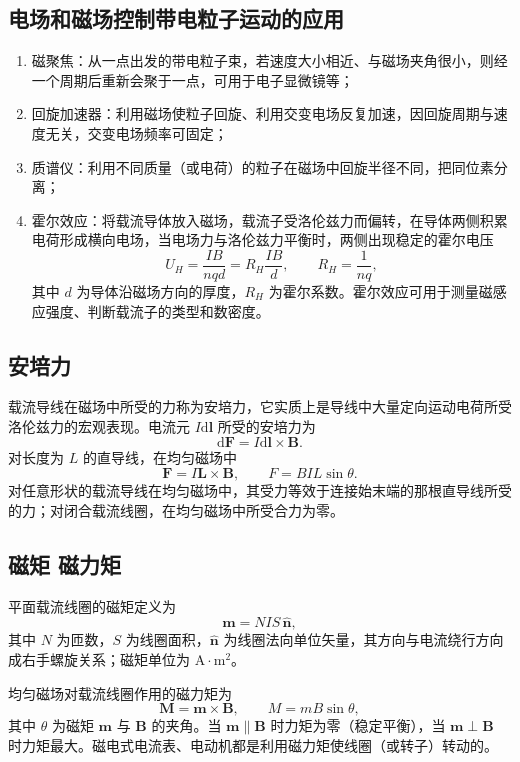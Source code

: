     \subsection{电场和磁场控制带电粒子运动的应用}
    \begin{enumerate}
        \item 磁聚焦：从一点出发的带电粒子束，若速度大小相近、与磁场夹角很小，则经一个周期后重新会聚于一点，可用于电子显微镜等；
        \item 回旋加速器：利用磁场使粒子回旋、利用交变电场反复加速，因回旋周期与速度无关，交变电场频率可固定；
        \item 质谱仪：利用不同质量（或电荷）的粒子在磁场中回旋半径不同，把同位素分离；
        \item 霍尔效应：将载流导体放入磁场，载流子受洛伦兹力而偏转，在导体两侧积累电荷形成横向电场，当电场力与洛伦兹力平衡时，两侧出现稳定的霍尔电压
        \[
        U_H=\frac{IB}{nqd}=R_H\frac{IB}{d},\qquad R_H=\frac{1}{nq},
        \]
        其中 $d$ 为导体沿磁场方向的厚度，$R_H$ 为霍尔系数。霍尔效应可用于测量磁感应强度、判断载流子的类型和数密度。
    \end{enumerate}

    \subsection{安培力}
    载流导线在磁场中所受的力称为安培力，它实质上是导线中大量定向运动电荷所受洛伦兹力的宏观表现。电流元 $I\mathrm{d}\boldsymbol{l}$ 所受的安培力为
    \[
    \mathrm{d}\boldsymbol{F}=I\mathrm{d}\boldsymbol{l}\times\boldsymbol{B}.
    \]
    对长度为 $L$ 的直导线，在均匀磁场中
    \[
    \boldsymbol{F}=I\boldsymbol{L}\times\boldsymbol{B},\qquad F=BIL\sin\theta.
    \]
    对任意形状的载流导线在均匀磁场中，其受力等效于连接始末端的那根直导线所受的力；对闭合载流线圈，在均匀磁场中所受合力为零。

    \subsection{磁矩 磁力矩}
    平面载流线圈的磁矩定义为
    \[
    \boldsymbol{m}=NIS\,\hat{\boldsymbol{n}},
    \]
    其中 $N$ 为匝数，$S$ 为线圈面积，$\hat{\boldsymbol{n}}$ 为线圈法向单位矢量，其方向与电流绕行方向成右手螺旋关系；磁矩单位为 $\mathrm{A\cdot m^{2}}$。

    均匀磁场对载流线圈作用的磁力矩为
    \[
    \boldsymbol{M}=\boldsymbol{m}\times\boldsymbol{B},\qquad M=mB\sin\theta,
    \]
    其中 $\theta$ 为磁矩 $\boldsymbol{m}$ 与 $\boldsymbol{B}$ 的夹角。当 $\boldsymbol{m}\parallel\boldsymbol{B}$ 时力矩为零（稳定平衡），当 $\boldsymbol{m}\perp\boldsymbol{B}$ 时力矩最大。磁电式电流表、电动机都是利用磁力矩使线圈（或转子）转动的。

